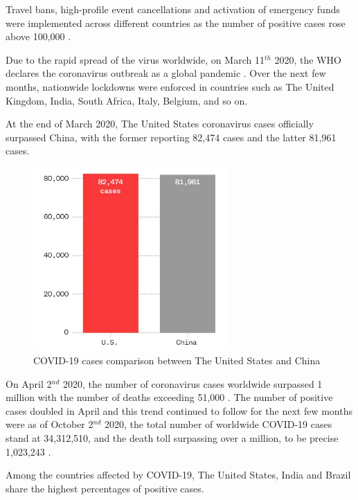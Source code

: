 Travel bans, high-profile event cancellations and activation of emergency funds were 
implemented across different countries as the number of positive cases rose above 100,000 \cite{SHA2020}.

Due to the rapid spread of the virus worldwide, on March 11$^{th}$ 2020, the WHO declares the coronavirus 
outbreak as a global pandemic \cite{JAS2020}. Over the next few months, nationwide 
lockdowns were enforced in countries such as The United Kingdom, India, South Africa, Italy, Belgium, and so on.

At the end of March 2020, The United States coronavirus cases officially surpassed China, with the former 
reporting 82,474 cases and the latter 81,961 cases.

\begin{figure}[H]
    \centering
    \includegraphics[height=7cm]{Images/usCases.JPG}
    \caption[COVID-19 Cases]{COVID-19 cases comparison between The United States and China \cite{GIV2020}}
    \label{fig:COVID-19 Cases Comparison}
    \end{figure}

On April 2$^{nd}$ 2020, the number of coronavirus cases worldwide surpassed 1 million with the number of deaths exceeding 51,000 \cite{PHI2020}. 
The number of positive cases doubled in April and this trend continued to follow for the next few months were as of 
October 2$^{nd}$ 2020, the total number of worldwide COVID-19 cases stand at 34,312,510, and the death toll surpassing over a million, to be precise 1,023,243 \cite{GGN2020}. 

Among the countries affected by COVID-19, The United States, India and Brazil share the 
highest percentages of positive cases.  

